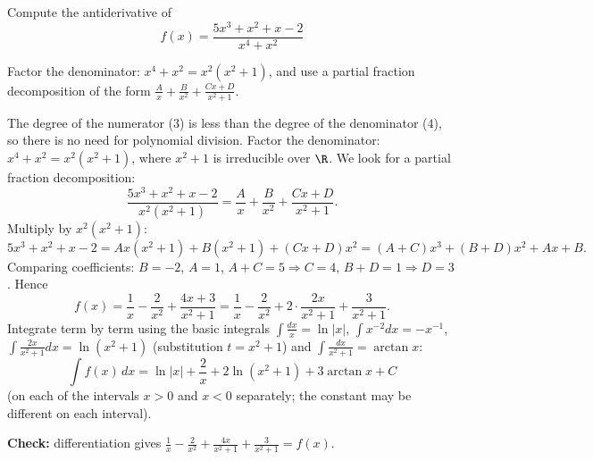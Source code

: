 
\begin{question}
Compute the antiderivative of
\[ f(x)=\frac{5x^3+x^2+x-2}{x^4+x^2} \]
\end{question}

\begin{hint}
Factor the denominator: $x^4+x^2=x^2(x^2+1)$, and use a partial fraction decomposition of the form $\frac Ax+\frac B{x^2}+\frac{Cx+D}{x^2+1}$.
\end{hint}

\begin{solution}
The degree of the numerator ($3$) is less than the degree of the denominator ($4$), so there is no need for polynomial division. Factor the denominator: $x^4+x^2=x^2(x^2+1)$, where $x^2+1$ is irreducible over $\R$. We look for a partial fraction decomposition:
\[ \frac{5x^3+x^2+x-2}{x^2(x^2+1)}=\frac Ax+\frac B{x^2}+\frac{Cx+D}{x^2+1}. \]
Multiply by $x^2(x^2+1)$:
\[ 5x^3+x^2+x-2=Ax(x^2+1)+B(x^2+1)+(Cx+D)x^2=(A+C)x^3+(B+D)x^2+Ax+B. \]
Comparing coefficients: $B=-2$, $A=1$, $A+C=5\Rightarrow C=4$, $B+D=1\Rightarrow D=3$. Hence
\[ f(x)=\frac1x-\frac2{x^2}+\frac{4x+3}{x^2+1}=\frac1x-\frac2{x^2}+2\cdot\frac{2x}{x^2+1}+\frac{3}{x^2+1}. \]
Integrate term by term using the basic integrals $\int\frac{dx}x=\ln|x|$, $\int x^{-2}dx=-x^{-1}$, $\int\frac{2x}{x^2+1}dx=\ln(x^2+1)$ (substitution $t=x^2+1$) and $\int\frac{dx}{x^2+1}=\arctan x$:
\[ \boxed{\int f(x)\,dx=\ln|x|+\frac2x+2\ln(x^2+1)+3\arctan x+C} \]
(on each of the intervals $x>0$ and $x<0$ separately; the constant may be different on each interval).

\textbf{Check:} differentiation gives $\frac1x-\frac2{x^2}+\frac{4x}{x^2+1}+\frac3{x^2+1}=f(x)$.
\end{solution}
